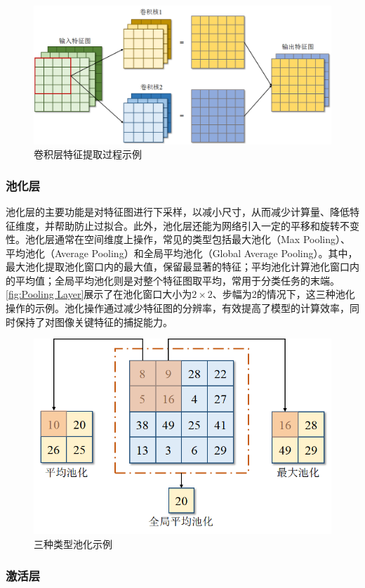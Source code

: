 \documentclass[lang=chs, degree=master, blindreview=false, adobe=false]{yanputhesis}
\begin{document}
\begin{figure}[htb]
	\centering
	\includegraphics[width=0.7\linewidth]{figs/卷积层特征提取过程示例.png}
	\caption{卷积层特征提取过程示例}
	\label{fig:Conv Layer}
\end{figure}

\subsubsection{池化层}

池化层的主要功能是对特征图进行下采样，以减小尺寸，从而减少计算量、降低特征维度，并帮助防止过拟合。此外，池化层还能为网络引入一定的平移和旋转不变性。池化层通常在空间维度上操作，常见的类型包括最大池化（Max Pooling）、平均池化（Average Pooling）和全局平均池化（Global Average Pooling）。其中，最大池化提取池化窗口内的最大值，保留最显著的特征；平均池化计算池化窗口内的平均值；全局平均池化则是对整个特征图取平均，常用于分类任务的末端。\autoref{fig:Pooling Layer}展示了在池化窗口大小为$2\times2$、步幅为2的情况下，这三种池化操作的示例。池化操作通过减少特征图的分辨率，有效提高了模型的计算效率，同时保持了对图像关键特征的捕捉能力。

\begin{figure}[htb]
	\centering
	\includegraphics[width=0.7\linewidth]{figs/三种类型池化示例.png}
	\caption{三种类型池化示例}
	\label{fig:Pooling Layer}
\end{figure}

\subsubsection{激活层}
\end{document}

